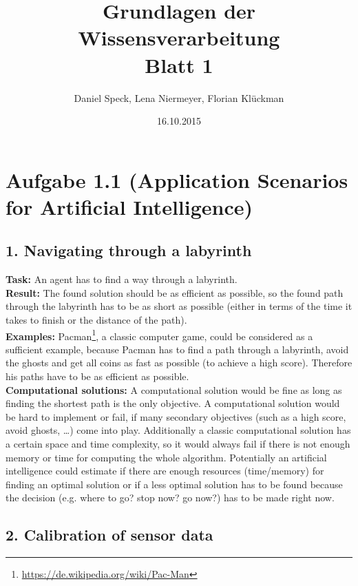 \documentclass[10pt,a4paper]{article}
\title{\textbf{\huge Grundlagen der Wissensverarbeitung
\\\Large Blatt 1}}
\author{Daniel Speck, Lena Niermeyer, Florian Klückman}
\date{16.10.2015}
\begin{document}
	\maketitle




	\section*{Aufgabe 1.1 (Application Scenarios for Artificial Intelligence)}
	
		\subsection*{1. Navigating through a labyrinth}
		
			\textbf{Task:} An agent has to find a way through a labyrinth.
			\\
			\textbf{Result:} The found solution should be as efficient as possible, so the found path through the labyrinth has to be as short as possible (either in terms of the time it takes to finish or the distance of the path).
			\\
			\textbf{Examples:} Pacman\footnote{\url{https://de.wikipedia.org/wiki/Pac-Man}}, a classic computer game, could be considered as a sufficient example, because Pacman has to find a path through a labyrinth, avoid the ghosts and get all coins as fast as possible (to achieve a high score). Therefore his paths have to be as efficient as possible.
			\\
			\textbf{Computational solutions:} A computational solution would be fine as long as finding the shortest path is the only objective. A computational solution would be hard to implement or fail, if many secondary objectives (such as a high score, avoid ghosts, \dots) come into play. Additionally a classic computational solution has a certain space and time complexity, so it would always fail if there is not enough memory or time for computing the whole algorithm. Potentially an artificial intelligence could estimate if there are enough resources (time/memory) for finding an optimal solution or if a less optimal solution has to be found because the decision (e.g. where to go? stop now? go now?) has to be made right now.

		
		\subsection*{2. Calibration of sensor data}
		
\end{document}
